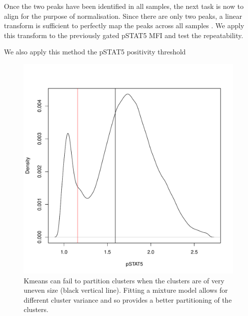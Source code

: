 Once the two peaks have been identified in all samples, the next task is now to align for the purpose of normalisation.
Since there are only two peaks, a linear transform is sufficient to perfectly map the peaks across all samples .
We apply this transform to the previously gated pSTAT5 MFI and test the repeatability.

We also apply this method the pSTAT5 positivity threshold


\begin{figure}[h]
    \centering
    \includegraphics[scale=.5]{IL2/figures/kmeans-fail.pdf}
    {Kmeans can fail to partition clusters when the clusters are of very uneven size (black vertical line).}
    {
      Fitting a mixture model allows for different cluster variance and so provides a better partitioning of the clusters.
    }
\end{figure}



